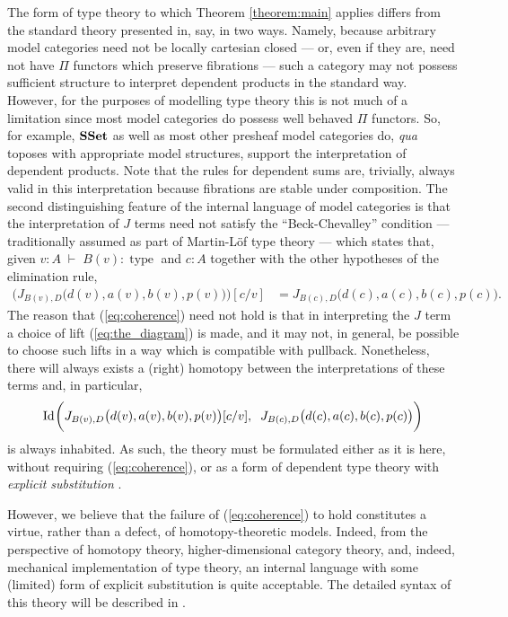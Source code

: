 \documentclass[12pt]{amsart}
\newcommand{\judge}[2]{#1\;\vdash\;#2}
\newcommand{\ssets}{\textnormal{\textbf{SSet}}}
\newcommand{\id}[1]{\textnormal{Id}_{#1}}
\newcommand{\type}{\operatorname{type}}
\theoremstyle{definition}
\theoremstyle{remark}
\begin{document}
The form of type theory to which Theorem \ref{theorem:main} applies
differs from the standard theory presented in, say,
\cite{MartinLof:ITT} in two ways. Namely, because arbitrary model
categories need not be locally
cartesian closed --- or, even if they are, need not have $\Pi$ functors which preserve
fibrations --- such a category may not possess sufficient structure to
interpret dependent products in the standard way.  However, for the purposes of
modelling type theory this is not much of a limitation since most
model categories do possess well behaved $\Pi$ functors.  So, for
example, $\ssets$ as well as most other presheaf model categories
do, \emph{qua} toposes with appropriate model structures, support the
interpretation of dependent products.  Note that the
rules for dependent sums are, trivially, always valid in this
interpretation because fibrations are stable under composition.  The second
distinguishing feature of the internal language of model categories is
that the interpretation of $J$ terms need not satisfy the
``Beck-Chevalley'' condition --- traditionally assumed as part of
Martin-L\"{o}f type theory --- which states that, given
$\judge{v:A}{B(v):\type}$ and $c:A$ together
with the other hypotheses of the elimination rule,
\begin{align}\label{eq:coherence}
  \biggl(J_{B(v),D}\bigl(d(v),a(v),b(v),p(v)\bigr)\biggr)[c/v] & = J_{B(c),D}\bigl(d(c),a(c),b(c),p(c)\bigr).
\end{align}
The reason that (\ref{eq:coherence}) need not hold is that in
interpreting the $J$ term a choice of lift (\ref{eq:the_diagram}) is
made, and it may not, in general, be possible
to choose such lifts in a way which is compatible with pullback.
Nonetheless, there will always exists a (right)
homotopy between the interpretations of these terms and, in particular,
\begin{align*}
  \id{}\biggl(J_{B(v),D}\bigl(d(v),a(v),b(v),p(v)\bigr)[c/v],\;\;J_{B(c),D}\bigl(d(c),a(c),b(c),p(c)\bigr)\biggr)
\end{align*}
is always inhabited.  As such, the theory must be formulated either
as it is here, without requiring (\ref{eq:coherence}), or as a
form of dependent type theory with \emph{explicit substitution}
\cite{Abadi:ES,Curien:SUI}.

However, we believe that the failure of (\ref{eq:coherence}) to hold
constitutes a virtue, rather than a defect, of homotopy-theoretic
models.  Indeed, from the perspective of homotopy theory,
higher-dimensional category theory, and, indeed, mechanical
implementation of type theory, an internal language with some
(limited) form of explicit substitution is quite acceptable.  The
detailed syntax of this theory will be described in \cite{Warren:PhD}.
\end{document}
